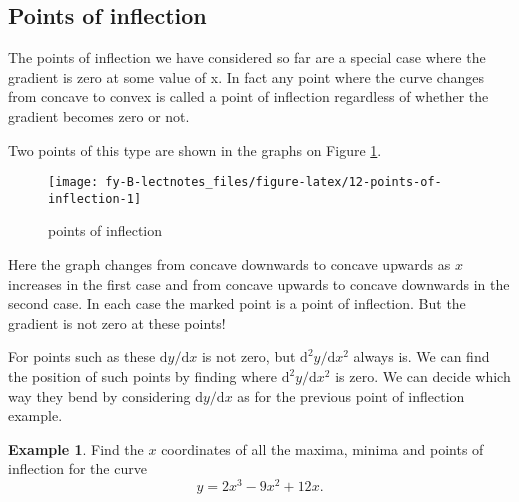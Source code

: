 \documentclass[
  11pt,
  oneside]{book}
\newcommand{\slide}{}
\theoremstyle{definition}
\theoremstyle{definition}
\newtheorem{example}{Example}[chapter]
\theoremstyle{definition}
\theoremstyle{definition}
\theoremstyle{remark}
\begin{document}
\slide

\subsection{Points of inflection}\label{points-of-inflection-1}

The points of inflection we have considered so far are a special case where the gradient is zero at
some value of x. In fact any point where the curve changes from concave to convex is called a
point of inflection regardless of whether the gradient becomes zero or not.

\slide

Two points of this type
are shown in the graphs on Figure \ref{fig:12-points-of-inflection}.

\begin{figure}

{\centering \texttt{[image: fy-B-lectnotes\_files/figure-latex/12-points-of-inflection-1]} 

}

\caption{points of inflection}\label{fig:12-points-of-inflection}
\end{figure}

Here the graph changes from concave downwards to concave upwards as \(x\) increases in the first case and from concave upwards to concave downwards in the second case. In each case the marked point is a point of inflection. But the gradient is not zero at these points!

\slide

For points such as these \(\mathrm{d}y/\mathrm{d} x\) is not zero, but \(\mathrm{d}^{2}y/\mathrm{d} x^2\) always is. We can find the position of such points by finding where \(\mathrm{d}^{2}y/\mathrm{d} x^2\) is zero. We can decide which way they bend by considering \(\mathrm{d}y/\mathrm{d} x\) as for the previous point of inflection example.
\slide

\begin{example}
Find the \(x\) coordinates of all the maxima, minima and points of inflection for the curve
\[
y = 2x^3-9x^2+12x.
\]
\end{example}
\end{document}
